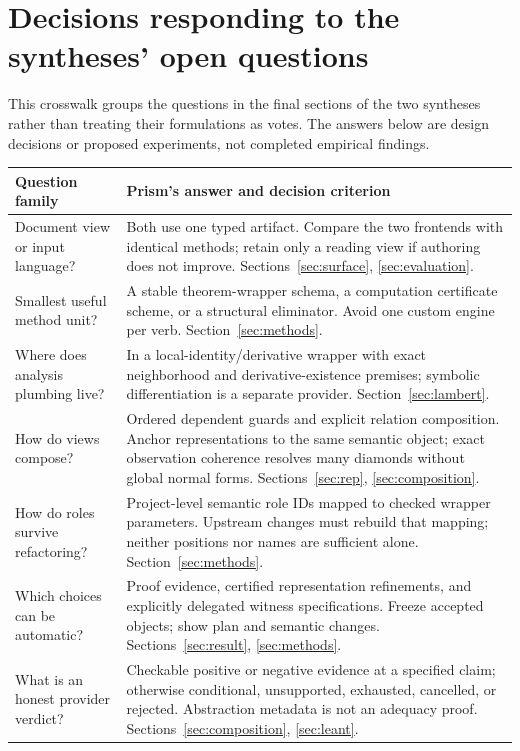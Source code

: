 \documentclass[11pt,a4paper]{article}
\theoremstyle{definition}
\theoremstyle{remark}
\begin{document}
\appendix
\section{Decisions responding to the syntheses' open questions}\label{app:questions}
This crosswalk groups the questions in the final sections of the two syntheses rather than treating their formulations as votes. The answers below are design decisions or proposed experiments, not completed empirical findings.
\begin{longtable}{@{}P{.30\textwidth}P{.62\textwidth}@{}}
\toprule
Question family & Prism's answer and decision criterion\\
\midrule
\endhead
Document view or input language? & Both use one typed artifact. Compare the two frontends with identical methods; retain only a reading view if authoring does not improve. Sections~\ref{sec:surface}, \ref{sec:evaluation}.\\
Smallest useful method unit? & A stable theorem-wrapper schema, a computation certificate scheme, or a structural eliminator. Avoid one custom engine per verb. Section~\ref{sec:methods}.\\
Where does analysis plumbing live? & In a local-identity/derivative wrapper with exact neighborhood and derivative-existence premises; symbolic differentiation is a separate provider. Section~\ref{sec:lambert}.\\
How do views compose? & Ordered dependent guards and explicit relation composition. Anchor representations to the same semantic object; exact observation coherence resolves many diamonds without global normal forms. Sections~\ref{sec:rep}, \ref{sec:composition}.\\
How do roles survive refactoring? & Project-level semantic role IDs mapped to checked wrapper parameters. Upstream changes must rebuild that mapping; neither positions nor names are sufficient alone. Section~\ref{sec:methods}.\\
Which choices can be automatic? & Proof evidence, certified representation refinements, and explicitly delegated witness specifications. Freeze accepted objects; show plan and semantic changes. Sections~\ref{sec:result}, \ref{sec:methods}.\\
What is an honest provider verdict? & Checkable positive or negative evidence at a specified claim; otherwise conditional, unsupported, exhausted, cancelled, or rejected. Abstraction metadata is not an adequacy proof. Sections~\ref{sec:composition}, \ref{sec:leant}.\\

\end{longtable}
\end{document}
